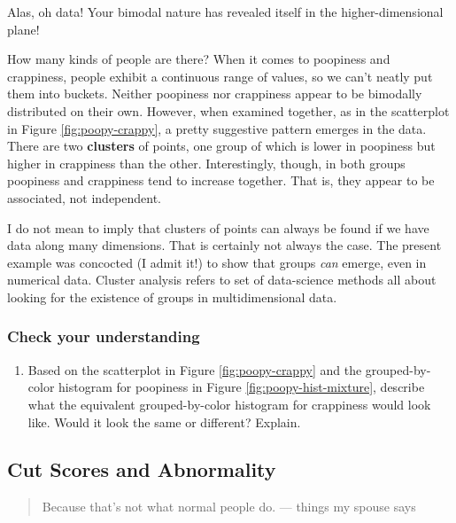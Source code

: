 \documentclass[]{book}
\providecommand{\tightlist}{%
  \setlength{\itemsep}{0pt}\setlength{\parskip}{0pt}}
\begin{document}
Alas, oh data! Your bimodal nature has revealed itself in the higher-dimensional plane!

How many kinds of people are there? When it comes to poopiness and crappiness, people exhibit a continuous range of values, so we can't neatly put them into buckets. Neither poopiness nor crappiness appear to be bimodally distributed on their own. However, when examined together, as in the scatterplot in Figure \ref{fig:poopy-crappy}, a pretty suggestive pattern emerges in the data. There are two \textbf{clusters} of points, one group of which is lower in poopiness but higher in crappiness than the other. Interestingly, though, in both groups poopiness and crappiness tend to increase together. That is, they appear to be associated, not independent.

I do not mean to imply that clusters of points can always be found if we have data along many dimensions. That is certainly not always the case. The present example was concocted (I admit it!) to show that groups \emph{can} emerge, even in numerical data. Cluster analysis \citep{kaufman2009} refers to set of data-science methods all about looking for the existence of groups in multidimensional data.

\hypertarget{check-your-understanding}{%
\subsubsection*{Check your understanding}\label{check-your-understanding}}

\begin{enumerate}
\def\labelenumi{\arabic{enumi})}
\tightlist
\item
  Based on the scatterplot in Figure \ref{fig:poopy-crappy} and the grouped-by-color histogram for poopiness in Figure \ref{fig:poopy-hist-mixture}, describe what the equivalent grouped-by-color histogram for crappiness would look like. Would it look the same or different? Explain.
\end{enumerate}

\hypertarget{cut-scores-and-abnormality}{%
\subsection{Cut Scores and Abnormality}\label{cut-scores-and-abnormality}}

\begin{quote}
Because that's not what normal people do.
--- things my spouse says
\end{quote}
\end{document}
